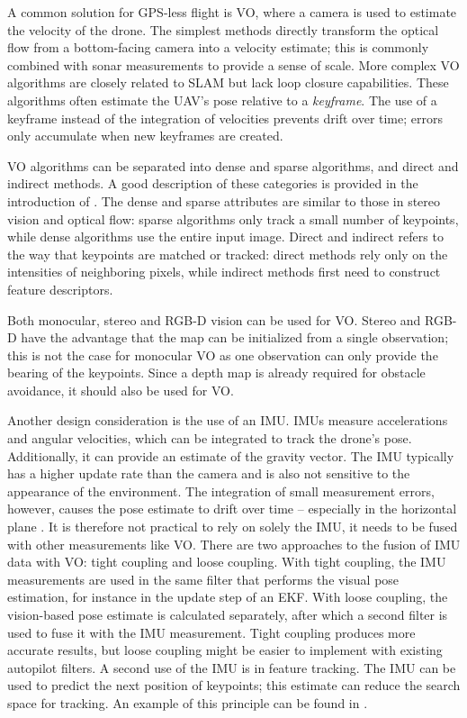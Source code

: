 A common solution for \ac{GPS}-less flight is \acf{VO}, where a camera is used to estimate the velocity of the drone.
The simplest methods directly transform the optical flow from a bottom-facing camera into a velocity estimate; this is commonly combined with sonar measurements to provide a sense of scale.
More complex \ac{VO} algorithms are closely related to \ac{SLAM} but lack loop closure capabilities.
These algorithms often estimate the \ac{UAV}'s pose relative to a \emph{keyframe}.
The use of a keyframe instead of the integration of velocities prevents drift over time; errors only accumulate when new keyframes are created.

\ac{VO} algorithms can be separated into dense and sparse algorithms, and direct and indirect methods.
A good description of these categories is provided in the introduction of \cite{Engel2017}.
The dense and sparse attributes are similar to those in stereo vision and optical flow: sparse algorithms only track a small number of keypoints, while dense algorithms use the entire input image.
Direct and indirect refers to the way that keypoints are matched or tracked: direct methods rely only on the intensities of neighboring pixels, while indirect methods first need to construct feature descriptors.

Both monocular, stereo and RGB-D vision can be used for \ac{VO}.
Stereo and RGB-D have the advantage that the map can be initialized from a single observation; this is not the case for monocular \ac{VO} as one observation can only provide the bearing of the keypoints.
Since a depth map is already required for obstacle avoidance, it should also be used for \ac{VO}.

Another design consideration is the use of an \ac{IMU}.
\acp{IMU} measure accelerations and angular velocities, which can be integrated to track the drone's pose.
Additionally, it can provide an estimate of the gravity vector.
The \ac{IMU} typically has a higher update rate than the camera and is also not sensitive to the appearance of the environment.
The integration of small measurement errors, however, causes the pose estimate to drift over time -- especially in the horizontal plane \cite{Woodman2007}.
It is therefore not practical to rely on solely the \ac{IMU}, it needs to be fused with other measurements like \ac{VO}.
There are two approaches to the fusion of \ac{IMU} data with \ac{VO}: tight coupling and loose coupling.
With tight coupling, the \ac{IMU} measurements are used in the same filter that performs the visual pose estimation, for instance in the update step of an \ac{EKF}.
With loose coupling, the vision-based pose estimate is calculated separately, after which a second filter is used to fuse it with the \ac{IMU} measurement.
Tight coupling produces more accurate results, but loose coupling might be easier to implement with existing autopilot filters.
A second use of the \ac{IMU} is in feature tracking.
The \ac{IMU} can be used to predict the next position of keypoints; this estimate can reduce the search space for tracking.
An example of this principle can be found in \cite{Sanfourche2013}.

